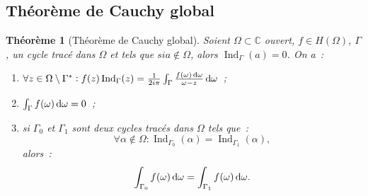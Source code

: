 \documentclass{report}
\newtheorem{thm}{Théorème}[chapter]
\theoremstyle{definition}
\theoremstyle{remark}
\numberwithin{equation}{section}
\newcommand{\C}{\mathbb C}
\DeclareMathOperator{\Ind}{Ind}
\begin{document}
		\subsection{Théorème de Cauchy global}
			\begin{thm}[Théorème de Cauchy global] Soient $\Omega \subset \C$ ouvert, $f \in H(\Omega)$, $\Gamma$, un cycle tracé dans $\Omega$
			et tels que $si a \not \in \Omega$, alors $\Ind_\Gamma(a) = 0$. On a~:
			\begin{enumerate}
				\item $\forall z \in \Omega \setminus \Gamma^* : f(z)\Ind_\Gamma(z) = \frac 1{2i\pi}\int_\Gamma\frac {f(\omega)\dif \omega}{\omega-z}\dif \omega$~;
				\item $\int_\Gamma f(\omega)\dif \omega = 0$~;
				\item si $\Gamma_0$ et $\Gamma_1$ sont deux cycles tracés dans $\Omega$ tels que~:
				\begin{equation}
					\forall \alpha \not \in \Omega : \Ind_{\Gamma_0}(\alpha) = \Ind_{\Gamma_1}(\alpha),
				\end{equation}
				alors~:
				\begin{equation}
					\int_{\Gamma_0}f(\omega)\dif \omega = \int_{\Gamma_1}f(\omega)\dif \omega.
				\end{equation}
			\end{enumerate}
			\end{thm}
\end{document}
